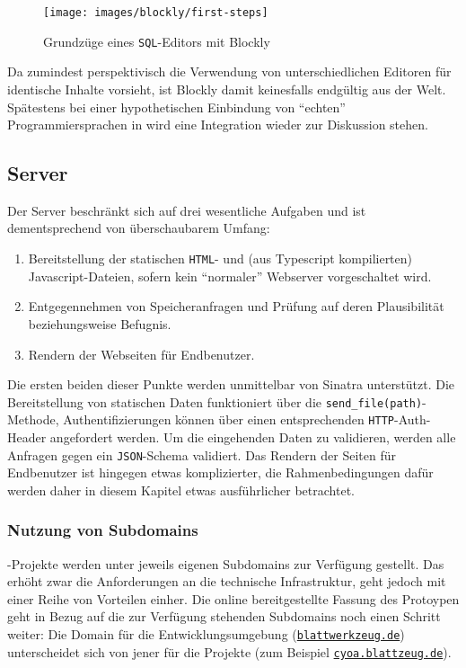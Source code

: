 \begin{figure}[t]
  \centering \texttt{[image: images/blockly/first-steps]}
  \caption{Grundzüge eines \texttt{SQL}-Editors mit Blockly}
  \label{fig:blockly-eval-sql}
\end{figure}

Da \idename{} zumindest perspektivisch die Verwendung von unterschiedlichen Editoren für identische Inhalte vorsieht, ist Blockly damit keinesfalls endgültig aus der Welt. Spätestens bei einer hypothetischen Einbindung von "`echten"' Programmiersprachen in \idename{} wird eine Integration wieder zur Diskussion stehen.

\subsection{Server}

Der Server beschränkt sich auf drei wesentliche Aufgaben und ist dementsprechend von überschaubarem Umfang:

\begin{enumerate}[noitemsep]
\item Bereitstellung der statischen \texttt{HTML}- und (aus Typescript kompilierten) Javascript-Dateien, sofern kein "`normaler"' Webserver vorgeschaltet wird.
\item Entgegennehmen von Speicheranfragen und Prüfung auf deren Plausibilität beziehungsweise Befugnis.
\item Rendern der Webseiten für Endbenutzer.
\end{enumerate}

Die ersten beiden dieser Punkte werden unmittelbar von Sinatra unterstützt. Die Bereitstellung von statischen Daten funktioniert über die \texttt{send\_file(path)}-Methode, Authentifizierungen können über einen entsprechenden \texttt{HTTP}-Auth-Header angefordert werden. Um die eingehenden Daten zu validieren, werden alle Anfragen gegen ein \texttt{JSON}-Schema validiert. Das Rendern der Seiten für Endbenutzer ist hingegen etwas komplizierter, die Rahmenbedingungen dafür werden daher in diesem Kapitel etwas ausführlicher betrachtet.

\subsubsection{Nutzung von Subdomains}

\idename{}-Projekte werden unter jeweils eigenen Subdomains zur Verfügung gestellt. Das erhöht zwar die Anforderungen an die technische Infrastruktur, geht jedoch mit einer Reihe von Vorteilen einher. Die online bereitgestellte Fassung des Protoypen geht in Bezug auf die zur Verfügung stehenden Subdomains noch einen Schritt weiter: Die Domain für die Entwicklungsumgebung (\href{http://blattwerkzeug.de}{\texttt{blattwerkzeug.de}}) unterscheidet sich von jener für die Projekte (zum Beispiel \href{http://cyoa.blattzeug.de}{\texttt{cyoa.blattzeug.de}}).

